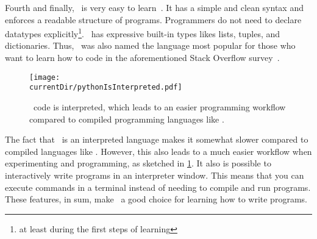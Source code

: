 Fourth and finally, \python\ is very easy to learn~\cite{GPBS2006WCTIPIHSUP,VR1999CPFERPASEFTPOT}.
It has a simple and clean syntax and enforces a readable structure of programs.
Programmers do not need to declare datatypes explicitly\footnote{at least during the first steps of learning}.
\python\ has expressive built-in types likes lists, tuples, and dictionaries.
Thus, \python\ was also named the language most popular for those who want to learn how to code in the aforementioned Stack Overflow survey~\cite{Y2025DWMMMT2RFSOADS}.
%
\begin{figure}%
\centering%
\texttt{[image: \\currentDir/pythonIsInterpreted.pdf]}%
\caption{\python\ code is interpreted, which leads to an easier programming workflow compared to compiled programming languages like .}%
\label{fig:pythonIsInterpreted}%
\end{figure}%
%
The fact that \python\ is an interpreted language makes it somewhat slower compared to compiled languages like .
However, this also leads to a much easier workflow when experimenting and programming, as sketched in \cref{fig:pythonIsInterpreted}.
It also is possible to interactively write programs in an interpreter window.
This means that you can execute commands in a \gls{terminal} instead of needing to compile and run programs.
These features, in sum, make \python\ a good choice for learning how to write programs.%
%
\endhsection%
%
